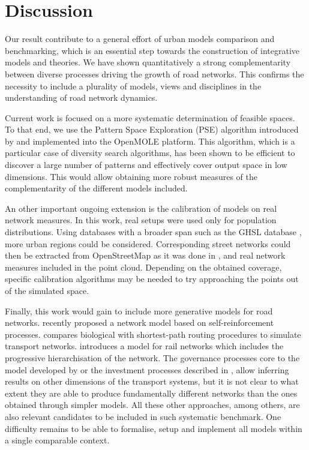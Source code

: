 \documentclass{article}
\begin{document}
\section{Discussion}

Our result contribute to a general effort of urban models comparison and benchmarking, which is an essential step towards the construction of integrative models and theories. We have shown quantitatively a strong complementarity between diverse processes driving the growth of road networks. This confirms the necessity to include a plurality of models, views and disciplines in the understanding of road network dynamics.

Current work is focused on a more systematic determination of feasible spaces. To that end, we use the Pattern Space Exploration (PSE) algorithm introduced by \cite{cherel2015beyond} and implemented into the OpenMOLE platform. This algorithm, which is a particular case of diversity search algorithms, has been shown to be efficient to discover a large number of patterns and effectively cover output space in low dimensions. This would allow obtaining more robust measures of the complementarity of the different models included.

An other important ongoing extension is the calibration of models on real network measures. In this work, real setups were used only for population distributions. Using databases with a broader span such as the GHSL database \cite{florczyk2019ghsl}, more urban regions could be considered. Corresponding street networks could then be extracted from OpenStreetMap as it was done in \cite{raimbault2019urban}, and real network measures included in the point cloud. Depending on the obtained coverage, specific calibration algorithms may be needed to try approaching the points out of the simulated space.

Finally, this work would gain to include more generative models for road networks. \cite{molinero2020model} recently proposed a network model based on self-reinforcement processes. \cite{queyroi2018biological} compares biological with shortest-path routing procedures to simulate transport networks. \cite{mimeur:tel-01451164} introduces a model for rail networks which includes the progressive hierarchisation of the network. The governance processes core to the model developed by \cite{raimbault2021introducing} or the investment processes described in \cite{cats2020modelling}, allow inferring results on other dimensions of the transport systems, but it is not clear to what extent they are able to produce fundamentally different networks than the ones obtained through simpler models. All these other approaches, among others, are also relevant candidates to be included in such systematic benchmark. One difficulty remains to be able to formalise, setup and implement all models within a single comparable context.






\end{document}
